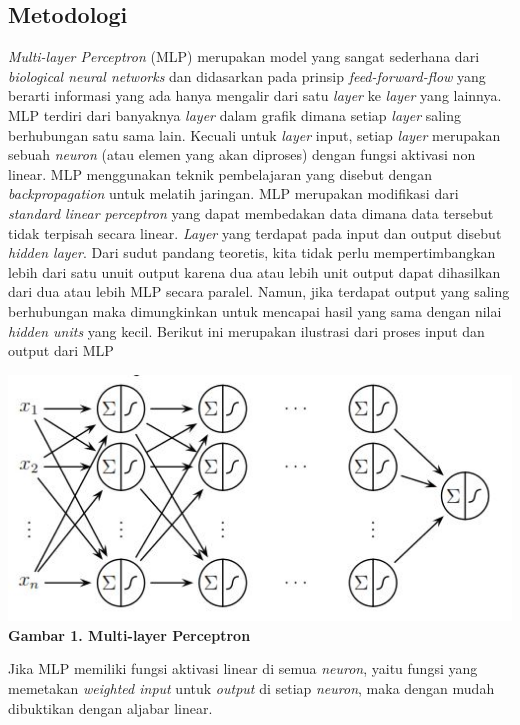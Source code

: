 	\subsection{Metodologi}
	\textit{Multi-layer Perceptron} (MLP) merupakan model yang sangat sederhana dari \textit{biological neural networks} dan didasarkan pada prinsip \textit{feed-forward-flow} yang berarti informasi yang ada hanya mengalir dari satu \textit{layer} ke \textit{layer} yang lainnya. MLP terdiri dari banyaknya \textit{layer} dalam grafik dimana setiap \textit{layer} saling berhubungan satu sama lain. Kecuali untuk \textit{layer} input, setiap \textit{layer} merupakan sebuah \textit{neuron} (atau elemen yang akan diproses) dengan fungsi aktivasi non linear. MLP menggunakan teknik pembelajaran yang disebut dengan \textit{backpropagation} untuk melatih jaringan. MLP merupakan modifikasi dari \textit{standard linear perceptron} yang dapat membedakan data dimana data tersebut tidak terpisah secara linear. \textit{Layer} yang terdapat pada input dan output disebut \textit{hidden layer}. Dari sudut pandang teoretis, kita tidak perlu mempertimbangkan lebih dari satu unuit output karena dua atau lebih unit output dapat dihasilkan dari dua atau lebih MLP secara paralel. Namun, jika terdapat output yang saling berhubungan maka dimungkinkan untuk mencapai hasil yang sama dengan nilai \textit{hidden units} yang kecil. Berikut ini merupakan ilustrasi dari proses input dan output dari MLP
	\begin{center}
		\includegraphics{images-1.jpg}
		\newline \textbf{Gambar 1. Multi-layer Perceptron}
	\end{center}
	\par Jika MLP memiliki fungsi aktivasi linear di semua \textit{neuron}, yaitu fungsi yang memetakan \textit{weighted input} untuk \textit{output} di setiap \textit{neuron}, maka dengan mudah dibuktikan dengan aljabar linear.
